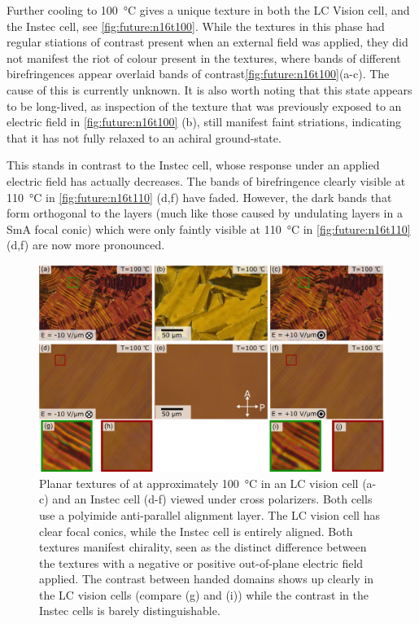 \documentclass[aagreenthesis]{subfiles}
\begin{document}
Further cooling to \SI{100}{\degreeCelsius} gives a unique texture in both the
LC Vision cell, and the Instec cell, see \autoref{fig:future:n16t100}. While the \nfour{} textures in this phase
had regular stiations of contrast present when an external field was applied,
they did not manifest the riot of colour present in the \nsix{} textures, where
bands of different birefringences appear overlaid bands of
contrast\autoref{fig:future:n16t100}(a-c). The cause
of this is currently unknown. It is also worth noting that this state appears to
be long-lived, as inspection of the texture that was previously exposed to an
electric field in \autoref{fig:future:n16t100} (b), still manifest faint
striations, indicating that it has not fully relaxed to an achiral ground-state.  

This stands in contrast to the Instec cell, whose response under an applied
electric field has actually decreases. The bands of birefringence clearly
visible at \SI{110}{\degreeCelsius} in \autoref{fig:future:n16t110} (d,f) have
faded. However, the dark bands that form orthogonal to the layers (much like
those caused by
undulating layers in a SmA focal conic) which were only faintly visible at
\SI{110}{\degreeCelsius} in \autoref{fig:future:n16t110} (d,f) are now more
pronounced.

\begin{figure}[h!]
    \centering
\includegraphics[width=\textwidth]{figs/pal30/future/LCvIn100.png}
    \caption{\label{fig:future:n161t100}  Planar textures of \nsix{} at
        approximately \SI{100}{\degreeCelsius} in an LC vision cell
    (a-c) and an Instec cell (d-f) viewed under cross polarizers. Both cells use a polyimide anti-parallel
alignment layer. The LC vision cell has clear focal conics, while the Instec
cell is entirely aligned. Both textures manifest chirality, seen as the distinct
difference between the textures with a negative or positive out-of-plane
electric field applied. The contrast between handed domains shows up clearly in
the LC vision cells (compare (g) and (i)) while the contrast in the Instec cells
is barely distinguishable. }
\end{figure}
\end{document}
